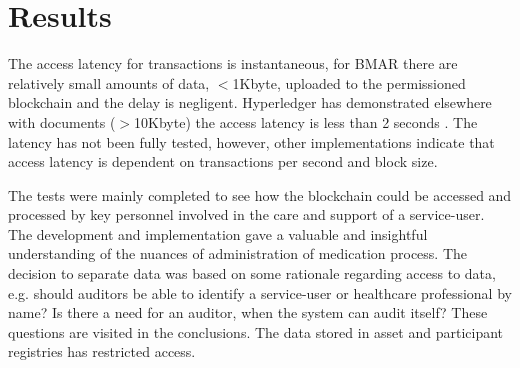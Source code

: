 \documentclass[runningheads]{llncs}
\begin{document}
\section{Results}\label{sec:results}
The access latency for transactions is instantaneous, for BMAR there are relatively small amounts of data, $<$1Kbyte, uploaded to the permissioned blockchain and the delay is negligent. Hyperledger has demonstrated elsewhere with documents ($>$10Kbyte) the access latency is less than 2 seconds \cite{androulaki2018hyperledger}. The latency has not been fully tested, however, other implementations \cite{thakkar2018performance} indicate that access latency is dependent on transactions per second and block size. 

The tests were mainly completed to see how the blockchain could be accessed and processed by key personnel involved in the care and support of a service-user. The development and implementation gave a valuable and insightful understanding of the nuances of administration of medication process. The decision to separate data was based on some rationale regarding access to data, e.g. should auditors be able to identify a service-user or healthcare professional by name? Is there a need for an auditor, when the system can audit itself? These questions are visited in the conclusions. The data stored in asset and participant registries has restricted access. 
\end{document}
